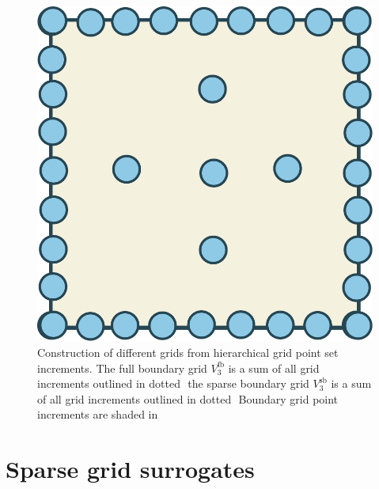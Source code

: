 \documentclass[
  a4paper,  %
  twoside,  %
  bibliography=totoc,
  headsepline,
  cleardoublepage=empty,
  parskip=half,
  draft=false
]{scrbook}
\begin{document}
\begin{mdframed}[style=style]
\begin{figure}[H]
\begin{minipage}{0.28\textwidth}
\vspace{4.5mm}
  \includegraphics[width=.8\linewidth]{graphics/sparse_grid}
    \end{minipage}
\vspace{2.5mm}
\delimit
\caption{Construction of different grids from hierarchical grid point set increments. The full boundary grid $V^{\text{fb}}_{3}$ is a sum of all grid increments outlined in dotted \greencomma\,\,the sparse boundary grid $V^{\text{sb}}_{3}$ is a sum of all grid increments outlined in dotted \reddot\,\,Boundary grid point increments are shaded in \greydot}
\label{fig:grid_construction}
\end{figure}
\end{mdframed}

\section{Sparse grid surrogates}
\label{sec:gsc}
\end{document}
